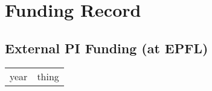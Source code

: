 \chapter{Funding Record}

\section{External PI Funding (at EPFL)}

\begin{tabular}[l]{ p{} p{} }

year & thing\\
\end{tabular} 